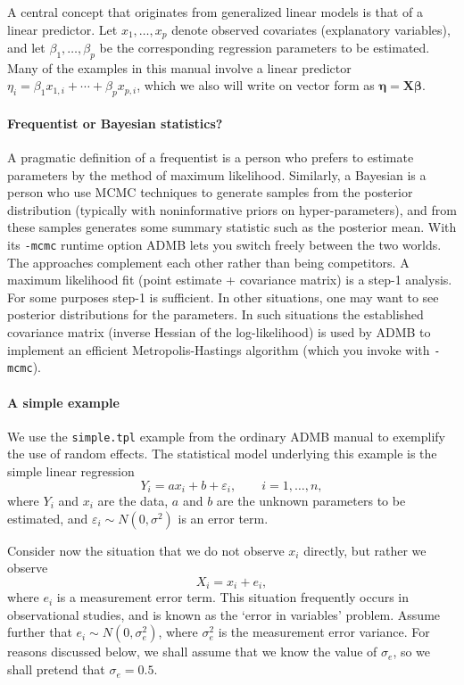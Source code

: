 \documentclass[12pt,letter,reqno]{book}
\begin{document}
A central concept that originates from generalized linear models is that of a linear predictor. Let
$x_{1},\ldots ,x_{p}$ denote observed covariates (explanatory variables), and let $\beta _{1},\ldots ,\beta
_{p}$ be the corresponding regression parameters to be estimated. Many of the examples in this manual involve a
linear predictor $\eta_{i}=\beta_{1}x_{1,i}+\cdots +\beta_{p}x_{p,i}$, which we also will write on vector form as
$\mathbf{\eta}=\mathbf{X\beta }$. 

\paragraph{Frequentist or Bayesian statistics?}
A pragmatic definition of a frequentist is a person who prefers to estimate parameters by the method of maximum likelihood.
Similarly, a Bayesian is a person who use MCMC techniques to generate samples from the posterior distribution
(typically with noninformative priors on hyper-parameters), and from these samples generates some summary
statistic such as the posterior mean. With its \texttt{-mcmc} runtime option ADMB lets you switch freely between
the two worlds. The approaches complement each other rather than being competitors. A maximum
likelihood fit (point estimate + covariance matrix) is a step-1 analysis. For some purposes step-1 is
sufficient. In other situations, one may want to see posterior distributions for the parameters.
In such situations the established covariance matrix (inverse Hessian of the log-likelihood) is used by ADMB 
to implement an efficient Metropolis-Hastings algorithm (which you invoke with \texttt{-mcmc}).

\paragraph{A simple example}
We use the \texttt{simple.tpl} example from the ordinary ADMB manual to
exemplify the use of random effects. The statistical model underlying this
example is the simple linear regression
\[
Y_i=ax_i+b+\varepsilon_i,\qquad i=1,\ldots ,n,
\]
where $Y_i$ and $x_i$ are the data, $a$ and $b$ are the unknown parameters
to be estimated, and $\varepsilon_i\sim N(0,\sigma ^{2})$ is an error term.

Consider now the situation that we do not observe $x_i$ directly, but rather
we observe
\[
X_i=x_i+e_i,
\]
where $e_i$ is a measurement error term. This situation frequently occurs in
observational studies, and is known as the `error in variables' problem.
Assume further that $e_i\sim N(0,\sigma_{e}^{2})$, where $\sigma_{e}^{2}$ is
the measurement error variance. For reasons discussed below, we shall assume that we know
the value of $\sigma_e$, so we shall pretend that $\sigma_e=0.5$.
\end{document}
